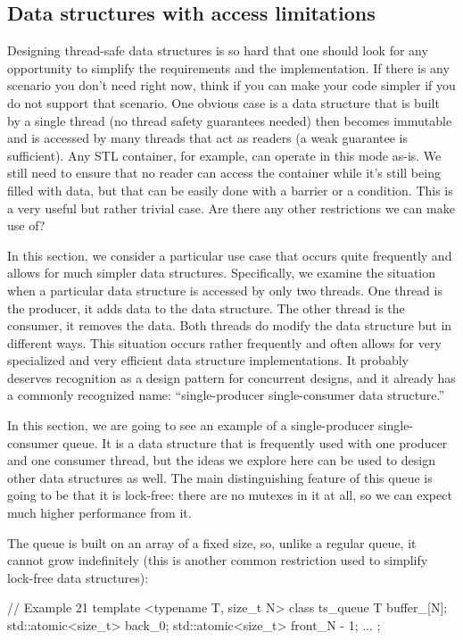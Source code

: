 \subsection{Data structures with access limitations}

Designing thread-safe data structures is so hard that one should look for any opportunity to simplify the requirements and the implementation. If there is any scenario you don't need right now, think if you can make your code simpler if you do not support that scenario. One obvious case is a data structure that is built by a single thread (no thread safety guarantees needed) then becomes immutable and is accessed by many threads that act as readers (a weak guarantee is sufficient). Any STL container, for example, can operate in this mode as-is. We still need to ensure that no reader can access the container while it's still being filled with data, but that can be easily done with a barrier or a condition. This is a very useful but rather trivial case. Are there any other restrictions we can make use of?

In this section, we consider a particular use case that occurs quite frequently and allows for much simpler data structures. Specifically, we examine the situation when a particular data structure is accessed by only two threads. One thread is the producer, it adds data to the data structure. The other thread is the consumer, it removes the data. Both threads do modify the data structure but in different ways. This situation occurs rather frequently and often allows for very specialized and very efficient data structure implementations. It probably deserves recognition as a design pattern for concurrent designs, and it already has a commonly recognized name: ``single-producer single-consumer data structure.''

In this section, we are going to see an example of a single-producer single-consumer queue. It is a data structure that is frequently used with one producer and one consumer thread, but the ideas we explore here can be used to design other data structures as well. The main distinguishing feature of this queue is going to be that it is lock-free: there are no mutexes in it at all, so we can expect much higher performance from it.

The queue is built on an array of a fixed size, so, unlike a regular queue, it cannot grow indefinitely (this is another common restriction used to simplify lock-free data structures):

\begin{code}
// Example 21
template <typename T, size_t N> class ts_queue {
  T buffer_[N];
  std::atomic<size_t> back_{0};
  std::atomic<size_t> front_{N - 1};
  ...
};
\end{code}

